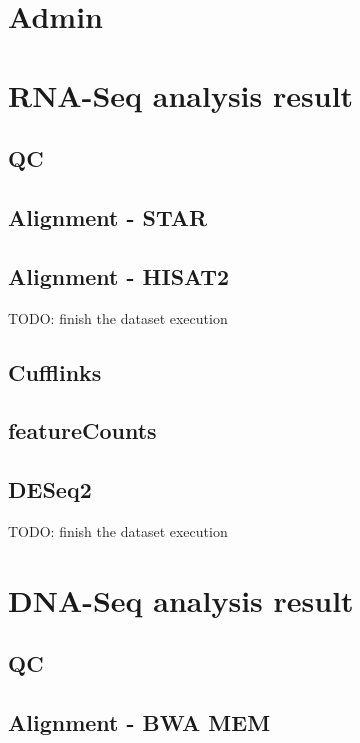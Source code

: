 \section{Admin}
\label{s:biocloud-admin}


\section{RNA-Seq analysis result}

\subsection{QC}

\subsection{Alignment - STAR}

\subsection{Alignment - HISAT2}

TODO: finish the dataset execution

\subsection{Cufflinks}

\subsection{featureCounts}

\subsection{DESeq2}

TODO: finish the dataset execution


\section{DNA-Seq analysis result}

\subsection{QC}

\subsection{Alignment - BWA MEM}

